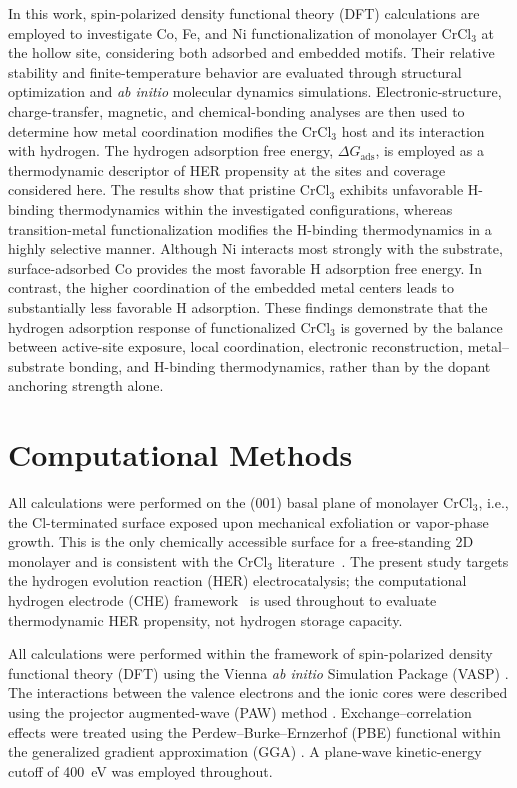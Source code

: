 \documentclass[journal=jacsat,manuscript=article]{achemso}
\begin{document}
In this work, spin-polarized density functional theory (DFT) calculations are employed to investigate Co, Fe, and Ni functionalization of monolayer CrCl$_3$ at the hollow site, considering both adsorbed and embedded motifs. Their relative stability and finite-temperature behavior are evaluated through structural optimization and \textit{ab initio} molecular dynamics simulations. Electronic-structure, charge-transfer, magnetic, and chemical-bonding analyses are then used to determine how metal coordination modifies the CrCl$_3$ host and its interaction with hydrogen. The hydrogen adsorption free energy, $\Delta G_{\mathrm{ads}}$, is employed as a thermodynamic descriptor of HER propensity at the sites and coverage considered here. The results show that pristine CrCl$_3$ exhibits unfavorable H-binding thermodynamics within the investigated configurations, whereas transition-metal functionalization modifies the H-binding thermodynamics in a highly selective manner. Although Ni interacts most strongly with the substrate, surface-adsorbed Co provides the most favorable H adsorption free energy. In contrast, the higher coordination of the embedded metal centers leads to substantially less favorable H adsorption. These findings demonstrate that the hydrogen adsorption response of functionalized CrCl$_3$ is governed by the balance between active-site exposure, local coordination, electronic reconstruction, metal--substrate bonding, and H-binding thermodynamics, rather than by the dopant anchoring strength alone.

\section{Computational Methods}

\noindent All calculations were performed on the (001) basal plane of monolayer CrCl$_3$, i.e., the Cl-terminated surface exposed upon mechanical exfoliation or vapor-phase growth. This is the only chemically accessible surface for a free-standing 2D monolayer and is consistent with the CrCl$_3$ literature~\cite{Webster2018,Mastrippolito2021,Zala2024}. The present study targets the hydrogen evolution reaction (HER) electrocatalysis; the computational hydrogen electrode (CHE) framework~\cite{NORSKOV2004,Norskov_2005} is used throughout to evaluate thermodynamic HER propensity, not hydrogen storage capacity.

\noindent All calculations were performed within the framework of spin-polarized density functional theory (DFT) using the Vienna \textit{ab initio} Simulation Package (VASP) \cite{Kresse1996CMS,Kresse1996PRB}. The interactions between
the valence electrons and the ionic cores were described using the projector augmented-wave (PAW) method \cite{Blochl1994,Kresse1999}. Exchange--correlation effects were treated using the Perdew--Burke--Ernzerhof (PBE) functional within the generalized gradient approximation (GGA) \cite{PhysRevLett.77.3865}. A plane-wave kinetic-energy cutoff of 400~eV was employed throughout.
\end{document}
